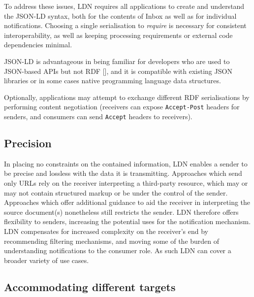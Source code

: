 \documentclass[a4paper]{llncs}
\begin{document}
                                        To address these issues, LDN requires all applications to create and understand the JSON-LD syntax, both for the contents of Inbox as well as for individual notifications. Choosing a single serialisation to {\em require} is necessary for consistent interoperability, as well as keeping processing requirements or external code dependencies minimal.

                                        JSON-LD is advantageous in being familiar for developers who are \empty used to JSON-based APIs but not RDF [], and it is compatible with existing JSON libraries or in some cases native programming language data structures.



\par Optionally, applications may attempt to exchange different RDF serialisations by performing content negotiation (receivers can expose {\tt Accept-Post} headers for senders, and consumers can send {\tt Accept} headers to receivers).




                                \subsection{Precision}
  \label{precision}



\par In placing no constraints on the contained information, LDN enables a sender to be precise and lossless with the data it is transmitting. Approaches which send only URLs rely on the receiver interpreting a third-party resource, which may or may not contain structured markup or be under the control of the sender. Approaches which offer additional guidance to aid the receiver in interpreting the source document(s) nonetheless still restricts the sender. LDN therefore offers flexibility to senders, increasing the potential uses for the notification mechanism. LDN compensates for increased complexity on the receiver’s end by recommending filtering mechanisms, and moving some of the burden of understanding notifications to the consumer role. As such LDN can cover a broader variety of use cases.




                                \subsection{Accommodating different targets}
  \label{accommodating-different-targets}
\end{document}
